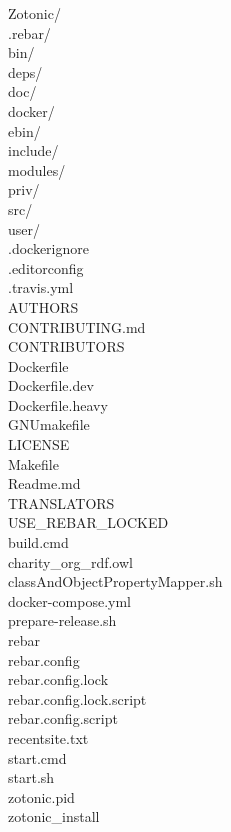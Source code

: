 	\begin{tabbing}
		\qquad Zotonic/ \\
		\qquad \qquad .rebar/ \\
		\qquad \qquad bin/ \\
		\qquad \qquad deps/ \\
		\qquad \qquad doc/ \\
		\qquad \qquad docker/ \\
		\qquad \qquad ebin/ \\
		\qquad \qquad include/ \\
		\qquad \qquad modules/ \\
		\qquad \qquad priv/ \\
		\qquad \qquad src/ \\
		\qquad \qquad user/ \\
		\qquad \qquad .dockerignore \\
		\qquad \qquad .editorconfig \\
		\qquad \qquad .travis.yml \\
		\qquad \qquad AUTHORS \\
		\qquad \qquad CONTRIBUTING.md \\
		\qquad \qquad CONTRIBUTORS \\
		\qquad \qquad Dockerfile \\
		\qquad \qquad Dockerfile.dev \\
		\qquad \qquad Dockerfile.heavy \\
		\qquad \qquad GNUmakefile \\
		\qquad \qquad LICENSE\\
		\qquad \qquad Makefile \\
		\qquad \qquad Readme.md \\
		\qquad \qquad TRANSLATORS \\
		\qquad \qquad USE\_REBAR\_LOCKED \\
		\qquad \qquad build.cmd \\
		\qquad \qquad charity\_org\_rdf.owl \\
		\qquad \qquad classAndObjectPropertyMapper.sh \\
		\qquad \qquad docker-compose.yml \\
		\qquad \qquad prepare-release.sh \\
		\qquad \qquad rebar \\
		\qquad \qquad rebar.config\\
		\qquad \qquad rebar.config.lock\\
		\qquad \qquad rebar.config.lock.script\\
		\qquad \qquad rebar.config.script\\
		\qquad \qquad recentsite.txt\\
		\qquad \qquad start.cmd\\
		\qquad \qquad start.sh\\
		\qquad \qquad zotonic.pid\\
		\qquad \qquad zotonic\_install
	\end{tabbing}
	
